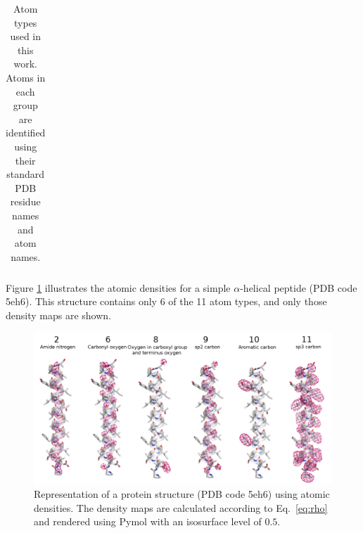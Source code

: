 \begin{table}[H]
\begin{center}
\begin{tabular}{ c | l | l }
\end{tabular}
    
    \caption {Atom types used in this work. Atoms in each group are
    identified using their standard PDB residue names and atom names.}

    \label{Tbl:atomTypes}
\end{center}
\end{table}

Figure \ref{Fig:atomic_densities} illustrates the atomic densities for
a simple $\alpha$-helical peptide (PDB code 5eh6). This structure
contains only 6 of the 11 atom types, and only those density maps are
shown.

\begin{figure}[H]
    \centering
    \includegraphics[width=\linewidth]{Fig/atomic_densities_V3.png}

    \caption{Representation of a protein structure (PDB code 5eh6)
    using atomic densities. The density maps are calculated according
    to Eq.~\ref{eq:rho} and rendered using Pymol \cite{PyMOL} with an
    isosurface level of $0.5$.}

    \label{Fig:atomic_densities}
\end{figure}
